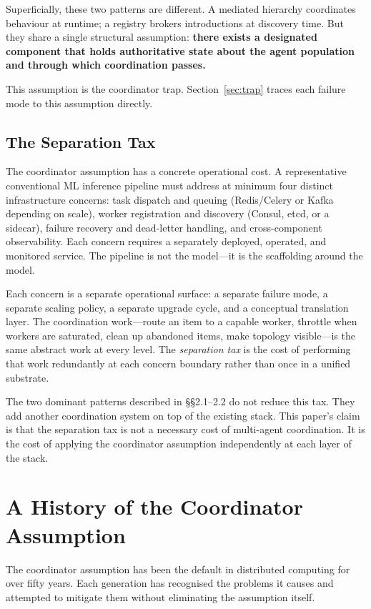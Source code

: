 \documentclass[11pt]{article}
\begin{document}
Superficially, these two patterns are different. A mediated hierarchy coordinates
behaviour at runtime; a registry brokers introductions at discovery time. But they
share a single structural assumption: \textbf{there exists a designated component
that holds authoritative state about the agent population and through which
coordination passes.}

This assumption is the coordinator trap. Section~\ref{sec:trap} traces each
failure mode to this assumption directly.

\subsection{The Separation Tax}

The coordinator assumption has a concrete operational cost. A representative
conventional ML inference pipeline must address at minimum four distinct
infrastructure concerns: task dispatch and queuing (Redis/Celery or Kafka
depending on scale), worker registration and discovery (Consul, etcd, or a
sidecar), failure recovery and dead-letter handling, and cross-component
observability. Each concern requires a separately deployed, operated, and
monitored service. The pipeline is not the model---it is the scaffolding around
the model.

Each concern is a separate operational surface: a separate failure mode, a
separate scaling policy, a separate upgrade cycle, and a conceptual translation
layer. The coordination work---route an item to a capable worker, throttle when
workers are saturated, clean up abandoned items, make topology visible---is the
same abstract work at every level. The \emph{separation tax} is the cost of
performing that work redundantly at each concern boundary rather than once in a
unified substrate.

The two dominant patterns described in \S\S2.1--2.2 do not reduce this tax. They
add another coordination system on top of the existing stack. This paper's claim
is that the separation tax is not a necessary cost of multi-agent coordination. It
is the cost of applying the coordinator assumption independently at each layer of
the stack.

\section{A History of the Coordinator Assumption}

The coordinator assumption has been the default in distributed computing for over
fifty years. Each generation has recognised the problems it causes and attempted
to mitigate them without eliminating the assumption itself.
\end{document}
